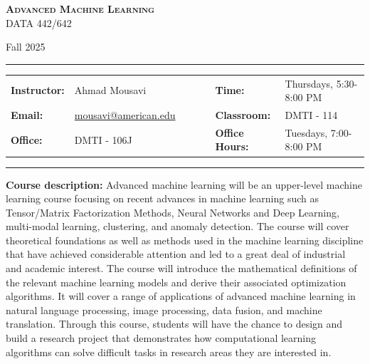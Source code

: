 \documentclass[11pt, a4paper]{article}
\begin{document}
\begin{center}
{\Large \textsc{\bf Advanced Machine Learning}}\\ DATA 442/642
\end{center}
\begin{center}
Fall 2025
\end{center}
\vspace{-1cm}
\begin{center}
\rule{6in}{0.4pt}
\begin{minipage}[t]{.865\textwidth}
\begin{tabular}{llcccll}
\textbf{Instructor:} & Ahmad Mousavi & & &  & \textbf{Time:} & Thursdays, 5:30-8:00 PM \\
\textbf{Email:} &  \href{mailto:mousavi@american.edu}{mousavi@american.edu} & & & & \textbf{Classroom:} & 
DMTI - 114\\
\textbf{Office:} &  DMTI - 106J & & & & \textbf{Office Hours:} & Tuesdays, 7:00-8:00 PM \\
\end{tabular}
\end{minipage}
\rule{6in}{0.4pt}
\end{center}

\setlength{\unitlength}{1in}
\renewcommand{\arraystretch}{2}

\noindent\textbf{Course description:} Advanced machine learning will be an upper-level machine learning course focusing on recent advances in machine learning such as Tensor/Matrix Factorization Methods, Neural Networks and Deep Learning, multi-modal learning, clustering, and anomaly detection. The course will cover theoretical foundations as well as methods used in the machine learning discipline that have achieved considerable attention and led to a great deal of industrial and academic interest. The course will introduce the mathematical definitions of the relevant machine learning models and derive their associated optimization algorithms. It will cover a range of applications of advanced machine learning in natural language processing, image processing, data fusion, and machine translation. Through this course, students will have the chance to design and build a research project that demonstrates how computational learning algorithms can solve difficult tasks in research areas they are interested in.
\end{document}
